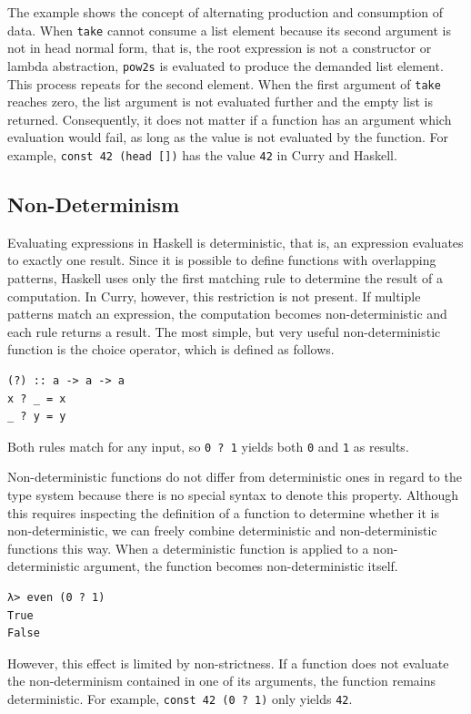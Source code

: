 \documentclass[a4paper, 11pt, fleqn, twoside]{scrreprt}
\newcommand{\hinl}[1]{\texttt{#1}}
\begin{document}
The example shows the concept of alternating production and consumption of data.
When \hinl{take} cannot consume a list element because its second argument is not in head normal form, that is, the root expression is not a constructor or lambda abstraction, \hinl{pow2s} is evaluated to produce the demanded list element.
This process repeats for the second element.
When the first argument of \hinl{take} reaches zero, the list argument is not evaluated further and the empty list is returned.
Consequently, it does not matter if a function has an argument which evaluation would fail, as long as the value is not evaluated by the function.
For example, \hinl{const 42 (head [])} has the value \hinl{42} in Curry and Haskell.

\subsection{Non-Determinism}
Evaluating expressions in Haskell is deterministic, that is, an expression evaluates to exactly one result.
Since it is possible to define functions with overlapping patterns, Haskell uses only the first matching rule to determine the result of a computation.
In Curry, however, this restriction is not present.
If multiple patterns match an expression, the computation becomes non-deterministic and each rule returns a result.
The most simple, but very useful non-deterministic function is the choice operator, which is defined as follows.

\begin{verbatim}
(?) :: a -> a -> a
x ? _ = x
_ ? y = y
\end{verbatim}

Both rules match for any input, so \hinl{0 ? 1} yields both \hinl{0} and \hinl{1} as results.

Non-deterministic functions do not differ from deterministic ones in regard to the type system because there is no special syntax to denote this property.
Although this requires inspecting the definition of a function to determine whether it is non-deterministic, we can freely combine deterministic and non-deterministic functions this way.
When a deterministic function is applied to a non-deterministic argument, the function becomes non-deterministic itself.

\begin{verbatim}
λ> even (0 ? 1)
True
False
\end{verbatim}

However, this effect is limited by non-strictness.
If a function does not evaluate the non-determinism contained in one of its arguments, the function remains deterministic.
For example, \hinl{const 42 (0 ? 1)} only yields \hinl{42}.
\end{document}
